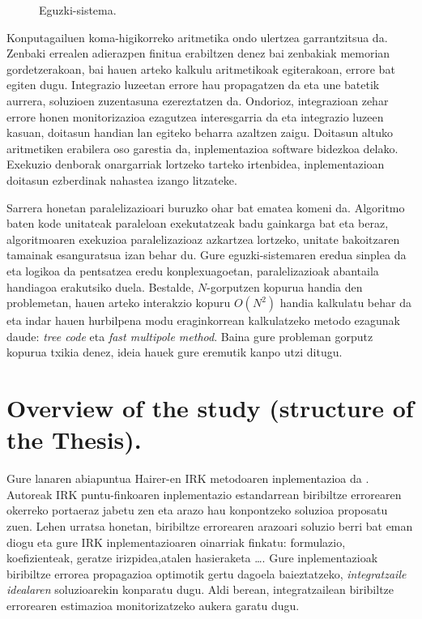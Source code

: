 \begin{figure}[h]
\centering
{}
\caption[Eguzki-sistema]{\small Eguzki-sistema.}
\label{fig:plot1}
\end{figure}    
   
Konputagailuen koma-higikorreko aritmetika ondo ulertzea garrantzitsua da. Zenbaki errealen adierazpen finitua erabiltzen denez bai zenbakiak memorian gordetzerakoan, bai hauen arteko kalkulu aritmetikoak egiterakoan, errore bat egiten dugu. Integrazio luzeetan errore hau propagatzen da eta une batetik aurrera, soluzioen zuzentasuna ezereztatzen da. Ondorioz, integrazioan zehar errore honen monitorizazioa ezagutzea interesgarria da eta integrazio luzeen kasuan, doitasun handian lan egiteko beharra azaltzen zaigu. Doitasun altuko aritmetiken erabilera oso garestia da, inplementazioa software bidezkoa delako. Exekuzio denborak onargarriak lortzeko tarteko irtenbidea, inplementazioan doitasun ezberdinak nahastea izango litzateke.       

Sarrera honetan paralelizazioari buruzko ohar bat ematea komeni da. Algoritmo baten kode unitateak paraleloan exekutatzeak badu gainkarga bat eta beraz,  algoritmoaren exekuzioa paralelizazioaz azkartzea lortzeko,  unitate bakoitzaren tamainak esanguratsua izan behar du. Gure eguzki-sistemaren eredua sinplea da eta logikoa da pentsatzea eredu konplexuagoetan, paralelizazioak abantaila handiagoa erakutsiko duela. Bestalde, $N$-gorputzen kopurua handia den problemetan, hauen arteko interakzio kopuru $O(N^2)$ handia kalkulatu behar da eta indar hauen hurbilpena modu eraginkorrean kalkulatzeko metodo ezagunak daude: \textit {tree code}\cite{Barnes1986} eta \textit {fast multipole method}\cite{Carrier1988}. Baina gure probleman gorputz kopurua txikia denez, ideia hauek gure eremutik kanpo utzi ditugu. 

\section{Overview of the study (structure of the Thesis).}

Gure lanaren abiapuntua Hairer-en IRK metodoaren inplementazioa da \cite{Hairer2008}. Autoreak IRK puntu-finkoaren inplementazio estandarrean biribiltze errorearen okerreko portaeraz jabetu zen eta arazo hau konpontzeko soluzioa proposatu zuen. Lehen urratsa honetan, biribiltze errorearen arazoari soluzio berri bat eman diogu eta gure IRK inplementazioaren oinarriak finkatu: formulazio, koefizienteak, geratze irizpidea,atalen hasieraketa \dots.
Gure inplementazioak biribiltze errorea propagazioa optimotik gertu dagoela baieztatzeko, \textit {integratzaile idealaren} soluzioarekin konparatu dugu. Aldi berean, integratzailean biribiltze errorearen estimazioa monitorizatzeko aukera garatu dugu.

